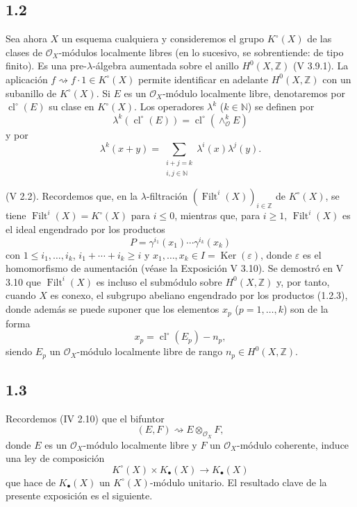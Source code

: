 \documentclass[11pt]{article}
\providecommand{\Filt}{\operatorname{Filt}}
\providecommand{\cl}{\operatorname{cl}}
\providecommand{\Ker}{\operatorname{Ker}}
\begin{document}
\subsection*{1.2}
Sea ahora $X$ un esquema cualquiera y consideremos el grupo $K^\circ(X)$ de
las clases de $\mathcal O_X$-módulos localmente libres (en lo sucesivo, se
sobrentiende: de tipo finito). Es una pre-$\lambda$-álgebra aumentada sobre el
anillo $H^0(X,\mathbb Z)$ (V 3.9.1). La aplicación
$f\rightsquigarrow f\cdot1\in K^\circ(X)$ permite identificar en adelante
$H^0(X,\mathbb Z)$ con un subanillo de $K^\circ(X)$. Si $E$ es un
$\mathcal O_X$-módulo localmente libre, denotaremos por $\cl^\circ(E)$ su clase
en $K^\circ(X)$. Los operadores $\lambda^k$ ($k\in\mathbb N$) se definen por
\begin{equation}\tag{1.2.1}
\lambda^k(\cl^\circ(E))=\cl^\circ(\wedge_{\mathcal O}^kE)
\end{equation}
y por
\begin{equation}\tag{1.2.2}
\lambda^k(x+y)=
\sum_{\substack{i+j=k\\ i,j\in\mathbb N}}\lambda^i(x)\lambda^j(y).
\end{equation}

(V 2.2). Recordemos que, en la $\lambda$-filtración
$(\Filt^i(X))_{i\in\mathbb Z}$ de $K^\circ(X)$, se tiene
$\Filt^i(X)=K^\circ(X)$ para $i\leq0$, mientras que, para $i\geq1$,
$\Filt^i(X)$ es el ideal engendrado por los productos
\begin{equation}\tag{1.2.3}
P=\gamma^{i_1}(x_1)\cdots\gamma^{i_k}(x_k)
\end{equation}
con $1\leq i_1,\ldots,i_k$, $i_1+\cdots+i_k\geq i$ y
$x_1,\ldots,x_k\in I=\Ker(\varepsilon)$, donde $\varepsilon$ es el
homomorfismo de aumentación (véase la Exposición V 3.10). Se demostró en
V 3.10 que $\Filt^i(X)$ es incluso el submódulo sobre $H^0(X,\mathbb Z)$ y,
por tanto, cuando $X$ es conexo, el subgrupo abeliano engendrado por los
productos (1.2.3), donde además se puede suponer que los elementos $x_p$
($p=1,\ldots,k$) son de la forma
\begin{equation}\tag{1.2.4}
x_p=\cl^\circ(E_p)-n_p,
\end{equation}
siendo $E_p$ un $\mathcal O_X$-módulo localmente libre de rango
$n_p\in H^0(X,\mathbb Z)$.

\subsection*{1.3}
Recordemos (IV 2.10) que el bifuntor
\[
(E,F)\rightsquigarrow E\otimes_{\mathcal O_X}F,
\]
donde $E$ es un $\mathcal O_X$-módulo localmente libre y $F$ un
$\mathcal O_X$-módulo coherente, induce una ley de composición
\begin{equation}\tag{1.3.1}
K^\circ(X)\times K_\bullet(X)\longrightarrow K_\bullet(X)
\end{equation}
que hace de $K_\bullet(X)$ un $K^\circ(X)$-módulo unitario. El resultado clave
de la presente exposición es el siguiente.
\end{document}
